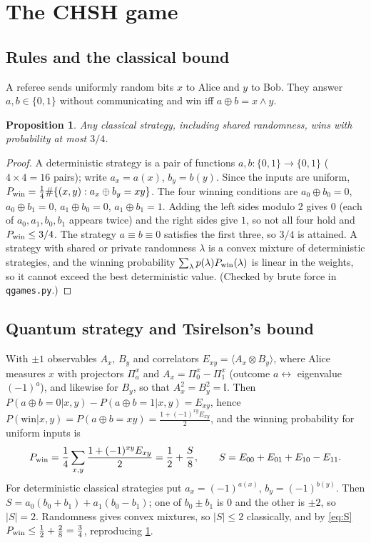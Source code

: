 \documentclass[11pt,a4paper]{article}
\newtheorem{proposition}{Proposition}
\begin{document}
\section{The CHSH game}

\subsection{Rules and the classical bound}
A referee sends uniformly random bits $x$ to Alice and $y$ to Bob. They answer $a,b\in\{0,1\}$ without communicating and win iff $a\oplus b=x\wedge y$.

\begin{proposition}\label{prop:classical}
Any classical strategy, including shared randomness, wins with probability at most $3/4$.
\end{proposition}
\begin{proof}
A deterministic strategy is a pair of functions $a,b:\{0,1\}\to\{0,1\}$ ($4\times4=16$ pairs); write $a_x=a(x)$, $b_y=b(y)$. Since the inputs are uniform, $P_{\rm win}=\frac14\#\{(x,y):a_x\oplus b_y=xy\}$. The four winning conditions are $a_0\oplus b_0=0$, $a_0\oplus b_1=0$, $a_1\oplus b_0=0$, $a_1\oplus b_1=1$. Adding the left sides modulo 2 gives $0$ (each of $a_0,a_1,b_0,b_1$ appears twice) and the right sides give $1$, so not all four hold and $P_{\rm win}\le3/4$. The strategy $a\equiv b\equiv 0$ satisfies the first three, so $3/4$ is attained. A strategy with shared or private randomness $\lambda$ is a convex mixture of deterministic strategies, and the winning probability $\sum_\lambda p(\lambda)P_{\rm win}(\lambda)$ is linear in the weights, so it cannot exceed the best deterministic value. (Checked by brute force in \texttt{qgames.py}.)
\end{proof}

\subsection{Quantum strategy and Tsirelson's bound}
With $\pm1$ observables $A_x$, $B_y$ and correlators $E_{xy}=\langle A_x\otimes B_y\rangle$, where Alice measures $x$ with projectors $\Pi^x_a$ and $A_x=\Pi^x_0-\Pi^x_1$ (outcome $a\leftrightarrow$ eigenvalue $(-1)^a$), and likewise for $B_y$, so that $A_x^2=B_y^2=\mathbb I$. Then $P(a\oplus b=0|x,y)-P(a\oplus b=1|x,y)=E_{xy}$, hence $P(\text{win}|x,y)=P(a\oplus b=xy)=\frac{1+(-1)^{xy}E_{xy}}{2}$, and the winning probability for uniform inputs is
\begin{equation}
P_{\rm win}=\frac14\sum_{x,y}\frac{1+(-1)^{xy}E_{xy}}{2}=\frac12+\frac{S}{8},\qquad
S=E_{00}+E_{01}+E_{10}-E_{11}.\label{eq:S}
\end{equation}
For deterministic classical strategies put $a_x=(-1)^{a(x)}$, $b_y=(-1)^{b(y)}$. Then $S=a_0(b_0+b_1)+a_1(b_0-b_1)$; one of $b_0\pm b_1$ is $0$ and the other is $\pm2$, so $|S|=2$. Randomness gives convex mixtures, so $|S|\le2$ classically, and by \cref{eq:S} $P_{\rm win}\le\frac12+\frac28=\frac34$, reproducing \cref{prop:classical}.
\end{document}
